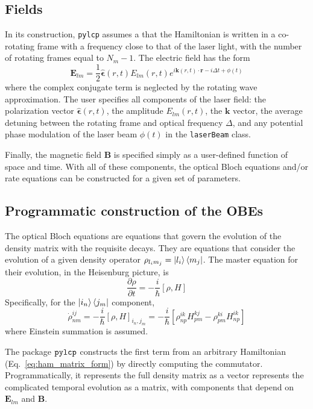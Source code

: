 \documentclass[final,5p,times,twocolumn]{elsarticle}
\begin{document}
\subsection{Fields}
In its construction, {\tt pylcp} assumes a that the Hamiltonian is written in a co-rotating frame with a frequency close to that of the laser light, with the number of rotating frames equal to $N_m-1$.  The electric field has the form
\begin{equation}
	\mathbf{E}_{lm} = \frac{1}{2}\hat{\boldsymbol{\epsilon}}(r, t) E_{lm}(r, t)e^{i\mathbf{k}(r,t)\cdot\mathbf{r}-i \Delta t + \phi(t)}
\end{equation}
where the complex conjugate term is neglected by the rotating wave approximation.  The user specifies all components of the laser field: the polarization vector $\hat{\boldsymbol{\epsilon}}(r, t)$, the amplitude $E_{lm}(r, t)$, the $\mathbf{k}$ vector, the average detuning between the rotating frame and optical frequency $\Delta$,  and any potential phase modulation of the laser beam $\phi(t)$ in the {\tt laserBeam} class.

Finally, the magnetic field $\mathbf{B}$ is specified simply as a user-defined function  of space and time.  With all of these components, the optical Bloch equations and/or rate equations can be constructed for a given set of parameters.

\subsection{Programmatic construction of the OBEs}
The optical Bloch equations are equations that govern the evolution of the density matrix with the requisite decays.  They are equations that consider the evolution of a given density operator $\rho_{l_im_j} = \ket{l_i}\Bra{m_j}$.  The master equation for their evolution, in the Heisenburg picture, is
\begin{equation}
	\frac{\partial \rho}{\partial t} = -\frac{i}{\hbar}[\rho, H]
\end{equation}
Specifically, for the $\ket{i_n}\Bra{j_m}$ component,
\begin{equation}
	\dot{\rho}^{ij}_{nm} = -\frac{i}{\hbar}[\rho, H]_{i_n, j_m} = -\frac{i}{\hbar}\left[\rho^{ik}_{np}H^{kj}_{pm} - \rho^{ki}_{pm}H^{ik}_{np}\right]
\end{equation}
where Einstein summation is assumed.

The package ${\tt pylcp}$ constructs the first term from an arbitrary Hamiltonian (Eq.~\ref{eq:ham_matrix_form}) by directly computing the commutator.  Programmatically, it  represents the full density matrix as a vector represents the complicated temporal evolution as a matrix, with components that depend on $\mathbf{E}_{lm}$ and $\mathbf{B}$.
\end{document}
